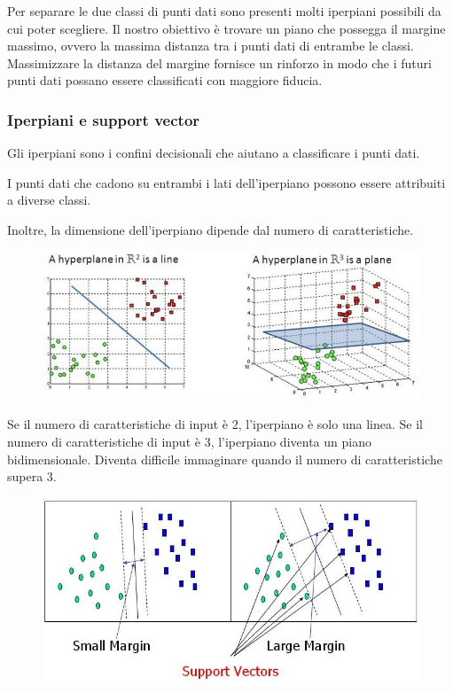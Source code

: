 Per separare le due classi di punti dati sono presenti molti iperpiani possibili da cui poter scegliere. Il nostro obiettivo è trovare un piano che possegga il margine massimo, ovvero la massima distanza tra i punti dati di entrambe le classi. Massimizzare la distanza del margine fornisce un rinforzo in modo che i futuri punti dati possano essere classificati con maggiore fiducia.

\subsubsection{Iperpiani e support vector}
Gli iperpiani sono i confini decisionali che aiutano a classificare i punti dati. 

I punti dati che cadono su entrambi i lati dell'iperpiano possono essere attribuiti a diverse classi. 

Inoltre, la dimensione dell’iperpiano  dipende dal numero di caratteristiche. 

\begin{figure}
    \begin{center}    
        \includegraphics[width=0.9\linewidth]{images/image27.jpeg}
    \end{center}
\end{figure}

\newpage
Se il numero di caratteristiche di input è 2, l'iperpiano è solo una linea. Se il numero di caratteristiche di input è 3, l'iperpiano diventa un piano bidimensionale. Diventa difficile immaginare quando il numero di caratteristiche supera 3.
\begin{figure}
    \begin{center}    
        \includegraphics[width=0.9\linewidth]{images/image28.jpeg}
    \end{center}
\end{figure}

